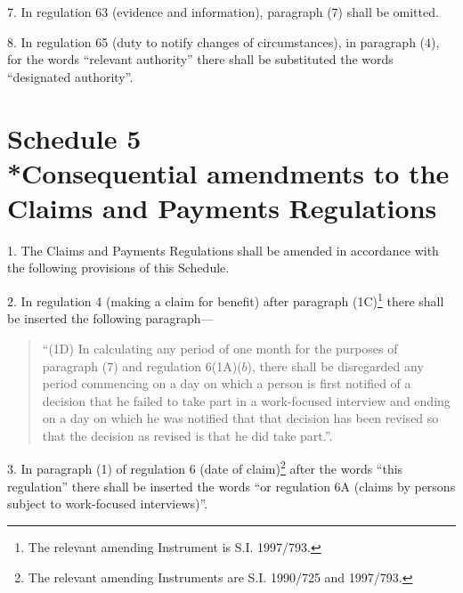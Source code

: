 \documentclass[12pt,a4paper]{article}
\begin{document}
\medskip

7.  In regulation 63 (evidence and information), paragraph (7) shall be omitted.

\medskip

8.  In regulation 65 (duty to notify changes of circumstances), in paragraph (4), for the words “relevant authority” there shall be substituted the words “designated authority”.

\part[Schedule 5 --- Consequential amendments to the Claims and Payments Regulations]{Schedule 5\\*Consequential amendments to the Claims and Payments Regulations}

\renewcommand\parthead{--- Schedule 5}

1.  The Claims and Payments Regulations shall be amended in accordance with the following provisions of this Schedule.

\medskip

2.  In regulation 4 (making a claim for benefit) after paragraph (1C)\footnote{\frenchspacing The relevant amending Instrument is S.I. 1997/793.} there shall be inserted the following paragraph—
\begin{quotation}
“(1D) In calculating any period of one month for the purposes of paragraph (7) and regulation 6(1A)($b$), there shall be disregarded any period commencing on a day on which a person is first notified of a decision that he failed to take part in a work-focused interview and ending on a day on which he was notified that that decision has been revised so that the decision as revised is that he did take part.”.
\end{quotation}

\medskip

3.  In paragraph (1) of regulation 6 (date of claim)\footnote{\frenchspacing The relevant amending Instruments are S.I. 1990/725 and 1997/793.} after the words “this regulation” there shall be inserted the words “or regulation 6A (claims by persons subject to work-focused interviews)”.

\medskip
\end{document}
